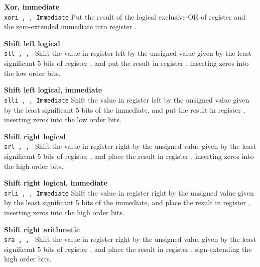 \noindent
{\bf Xor, immediate}\\
\noindent
\texttt{xori \regd, \regs, Immediate}
Put the result of the logical exclusive-OR of register \regs{} and the zero-extended immediate into register \regd{}.
\vspace{3ex}

\noindent
{\bf Shift left logical}\\
\noindent
\texttt{sll \regd, \regs, \regt}
Shift the value in register \regs{} left by the unsigned value given by the
least significant 5 bits of register \regt{}, and put the result in register \regd{},
inserting zeros into the low order bits.
\vspace{3ex}

\noindent
{\bf Shift left logical, immediate}\\
\noindent
\texttt{slli \regd, \regs, Immediate}
Shift the value in register \regs{} left by the unsigned value given by the
least significant 5 bits of the immediate, and put the result in register \regd{},
inserting zeros into the low order bits.
\vspace{3ex}

\noindent
{\bf Shift right logical}\\
\noindent
\texttt{srl \regd, \regs, \regt}
Shift the value in register \regs{} right by the unsigned value given by the
least significant 5 bits of register \regt{}, and place the result in register \regd{},
inserting zeros into the high order bits.
\vspace{3ex}

\noindent
{\bf Shift right logical, immediate}\\
\noindent
\texttt{srli \regd, \regs, Immediate}
Shift the value in register \regs{} right by the unsigned value given by the
least significant 5 bits of the immediate, and place the result in register \regd{},
inserting zeros into the high order bits.
\vspace{3ex}

\noindent
{\bf Shift right arithmetic}\\
\noindent
\texttt{sra \regd, \regs, \regt}
Shift the value in register \regs{} right by the unsigned value given by the
least significant 5 bits of register \regt{}, and place the result in register \regd{},
sign-extending the high order bits.
\vspace{3ex}
\newpage

